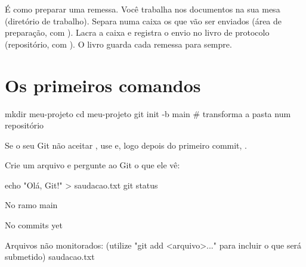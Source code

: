 \begin{center}
\end{center}

\begin{analogia}
É como preparar uma remessa. Você trabalha nos documentos na sua mesa (diretório de trabalho). Separa numa caixa os que vão ser enviados (área de preparação, com ). Lacra a caixa e registra o envio no livro de protocolo (repositório, com ). O livro guarda cada remessa para sempre.
\end{analogia}

\section{Os primeiros comandos}
\label{sec:primeiro-repo}

\begin{terminal}
mkdir meu-projeto
cd meu-projeto
git init -b main          # transforma a pasta num repositório
\end{terminal}

\begin{dica}
Se o seu Git não aceitar , use  e, logo depois do primeiro commit, .
\end{dica}

Crie um arquivo e pergunte ao Git o que ele vê:

\begin{terminal}
echo "Olá, Git!" > saudacao.txt
git status
\end{terminal}
\begin{saida}
No ramo main

No commits yet

Arquivos não monitorados:
  (utilize "git add <arquivo>..." para incluir o que será submetido)
    saudacao.txt
\end{saida}

